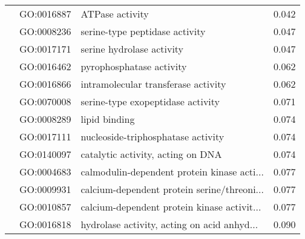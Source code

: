 \begin{longtable}{lllr}
   & GO:0016887 &                              ATPase activity &         0.042 \\
   & GO:0008236 &               serine-type peptidase activity &         0.047 \\
   & GO:0017171 &                    serine hydrolase activity &         0.047 \\
   & GO:0016462 &                     pyrophosphatase activity &         0.062 \\
   & GO:0016866 &          intramolecular transferase activity &         0.062 \\
   & GO:0070008 &            serine-type exopeptidase activity &         0.071 \\
   & GO:0008289 &                                lipid binding &         0.074 \\
   & GO:0017111 &           nucleoside-triphosphatase activity &         0.074 \\
   & GO:0140097 &            catalytic activity, acting on DNA &         0.074 \\
   & GO:0004683 &  calmodulin-dependent protein kinase acti... &         0.077 \\
   & GO:0009931 &  calcium-dependent protein serine/threoni... &         0.077 \\
   & GO:0010857 &  calcium-dependent protein kinase activit... &         0.077 \\
   & GO:0016818 &  hydrolase activity, acting on acid anhyd... &         0.090 \\
\end{longtable}

